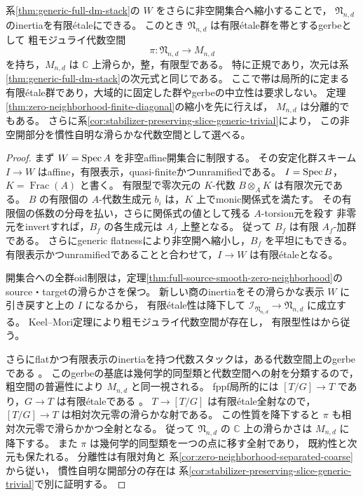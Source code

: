 \begin{corollary}[有限\'{e}taleなinertiaと滑らかな粗空間]
\label{cor:generic-finite-inertia-coarse}
系\ref{thm:generic-full-dm-stack}の $W$ をさらに非空開集合へ縮小することで，
$\mathfrak N_{n,d}$ のinertiaを有限\'{e}taleにできる。
このとき $\mathfrak N_{n,d}$ は有限\'{e}tale群を帯とするgerbeとして
粗モジュライ代数空間
\[
       \pi:\mathfrak N_{n,d}\longrightarrow M_{n,d}
\]
を持ち，$M_{n,d}$ は $\mathbb C$ 上滑らか，整，有限型である。
特に正規であり，次元は系\ref{thm:generic-full-dm-stack}の次元式と同じである。
ここで帯は局所的に定まる有限\'{e}tale群であり，大域的に固定した群やgerbeの中立性は要求しない。
定理\ref{thm:zero-neighborhood-finite-diagonal}の縮小を先に行えば，
$M_{n,d}$ は分離的でもある。
さらに系\ref{cor:stabilizer-preserving-slice-generic-trivial}により，
この非空開部分を慣性自明な滑らかな代数空間として選べる。
\end{corollary}
\begin{proof}
まず $W=\operatorname{Spec} A$ を非空affine開集合に制限する。
その安定化群スキーム $I\to W$ はaffine，有限表示，quasi-finiteかつunramifiedである。
$I=\operatorname{Spec} B$，$K=\operatorname{Frac}(A)$ と書く。
有限型で零次元の $K$-代数 $B\otimes_AK$ は有限次元である。
$B$ の有限個の $A$-代数生成元 $b_i$ は，$K$ 上でmonic関係式を満たす。
その有限個の係数の分母を払い，さらに関係式の値として残る $A$-torsion元を殺す
非零元をinvertすれば，$B_f$ の各生成元は $A_f$ 上整となる。
従って $B_f$ は有限 $A_f$-加群である。
さらにgeneric flatnessにより非空開へ縮小し，$B_f$ を平坦にもできる。
有限表示かつunramifiedであることと合わせて，$I\to W$ は有限\'{e}taleとなる。

開集合への全群oid制限は，定理\ref{thm:full-source-smooth-zero-neighborhood}の
source・targetの滑らかさを保つ。
新しい商のinertiaをその滑らかな表示 $W$ に引き戻すと上の $I$ になるから，
有限\'{e}tale性は降下して $\mathcal I_{\mathfrak N_{n,d}}\to\mathfrak N_{n,d}$ に成立する。
Keel--Mori定理\cite[Tag 0DUT]{StacksProject}により粗モジュライ代数空間が存在し，
有限型性は\cite[Tag 0DUW]{StacksProject}から従う。

さらにflatかつ有限表示のinertiaを持つ代数スタックは，ある代数空間上のgerbeである
\cite[Tag 06QJ]{StacksProject}。
このgerbeの基底は幾何学的同型類と代数空間への射を分類するので，
粗空間の普遍性により $M_{n,d}$ と同一視される。
fppf局所的には $[T/G]\to T$ であり，$G\to T$ は有限\'{e}taleである
\cite[Tag 06QH]{StacksProject}。
$T\to[T/G]$ は有限\'{e}tale全射なので，$[T/G]\to T$ は相対次元零の滑らかな射である。
この性質を降下すると $\pi$ も相対次元零で滑らかかつ全射となる。
従って $\mathfrak N_{n,d}$ の $\mathbb C$ 上の滑らかさは $M_{n,d}$ に降下する。
また $\pi$ は幾何学的同型類を一つの点に移す全射であり，
既約性と次元も保たれる。
分離性は有限対角と
系\ref{cor:zero-neighborhood-separated-coarse}から従い，
慣性自明な開部分の存在は
系\ref{cor:stabilizer-preserving-slice-generic-trivial}で別に証明する。
\end{proof}

